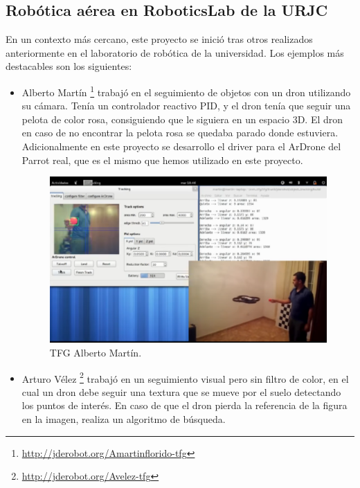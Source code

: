 \subsection{Robótica aérea en RoboticsLab de la URJC}
En un contexto más cercano, este proyecto se inició tras otros realizados
anteriormente en el laboratorio de robótica de la universidad. Los ejemplos más
destacables son los siguientes:
\begin{itemize}
\item Alberto Martín\cite{albertoMartin} \footnote{\url{http://jderobot.org/Amartinflorido-tfg}} trabajó en el seguimiento de objetos con un dron
utilizando su cámara. Tenía un controlador reactivo PID, y el dron tenía que seguir una pelota de color rosa, consiguiendo que le siguiera en un espacio 3D. El dron en caso de no encontrar la pelota rosa se quedaba parado donde estuviera. Adicionalmente en este proyecto se desarrollo el driver para el ArDrone del Parrot real, que es el mismo que hemos utilizado en este proyecto.

\begin{figure}[H]
  \centering
  \includegraphics[scale=0.8]{imagenes/AlbertoMartin.png}
  \caption{TFG Alberto Martín.}
  \label{fig:albertoMartin}
\end{figure}


\item Arturo Vélez\cite{arturoVelez} \footnote{\url{http://jderobot.org/Avelez-tfg}} trabajó en un seguimiento visual pero sin filtro de color,
en el cual un dron debe seguir una textura que se mueve por el suelo detectando los puntos de interés. En caso de que el dron pierda la referencia de la figura en la imagen, realiza un algoritmo de búsqueda.


\end{itemize}
